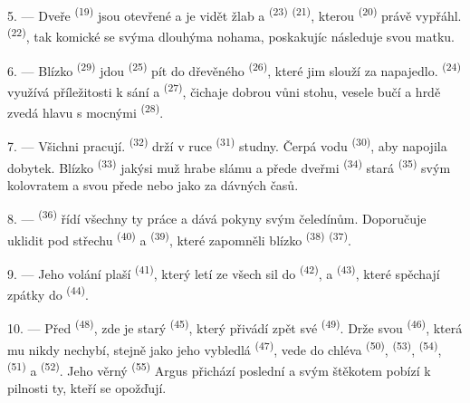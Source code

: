 \VUsaut{3.0mm}

5. --- Dveře  \textsuperscript{(19)} jsou otevřené a je vidět žlab a
 \textsuperscript{(23)}  \textsuperscript{(21)},
kterou  \textsuperscript{(20)} právě vypřáhl. 
\textsuperscript{(22)}, tak komické se svýma dlouhýma nohama, poskakujíc následuje svou matku.

6. --- Blízko  \textsuperscript{(29)} jdou 
\textsuperscript{(25)} pít do dřevěného  \textsuperscript{(26)}, které jim
slouží za napajedlo.  \textsuperscript{(24)} využívá příležitosti k sání a
 \textsuperscript{(27)}, čichaje dobrou vůni stohu, vesele bučí a hrdě zvedá hlavu
s mocnými  \textsuperscript{(28)}.

7. --- Všichni pracují.  \textsuperscript{(32)} drží v ruce
 \textsuperscript{(31)} studny. Čerpá vodu 
\textsuperscript{(30)}, aby napojila dobytek. Blízko  \textsuperscript{(33)}
jakýsi muž hrabe slámu a přede dveřmi  \textsuperscript{(34)} stará
 \textsuperscript{(35)} svým kolovratem a svou  přede
 nebo  jako za dávných časů.

\VUsaut{3.0mm}
\VUsaut{3.0mm}

8. ---  \textsuperscript{(36)} řídí všechny ty práce a dává pokyny svým
čeledínům. Doporučuje uklidit pod střechu  \textsuperscript{(40)} a
 \textsuperscript{(39)}, které zapomněli blízko 
\textsuperscript{(38)}  \textsuperscript{(37)}.

9. --- Jeho volání plaší  \textsuperscript{(41)}, který letí ze všech sil do
 \textsuperscript{(42)}, a  \textsuperscript{(43)}, které
spěchají zpátky do  \textsuperscript{(44)}.

10. --- Před  \textsuperscript{(48)}, zde je starý 
\textsuperscript{(45)}, který přivádí zpět své  \textsuperscript{(49)}. Drže
svou  \textsuperscript{(46)}, která mu nikdy nechybí, stejně jako jeho vybledlá
 \textsuperscript{(47)}, vede do chléva  \textsuperscript{(50)},
 \textsuperscript{(53)},  \textsuperscript{(54)}, 
\textsuperscript{(51)} a  \textsuperscript{(52)}. Jeho věrný 
\textsuperscript{(55)} Argus přichází poslední a svým štěkotem pobízí k pilnosti ty, kteří se
opožďují.

